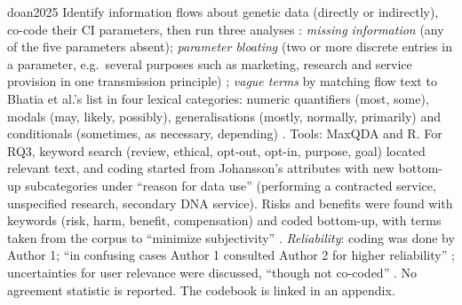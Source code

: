 \begin{papercard}{doan2025}
 Identify information flows about genetic data (directly or indirectly), co-code their CI parameters, then run three analyses : \emph{missing information} (any of the five parameters absent); \emph{parameter bloating} (two or more discrete entries in a parameter, e.g.\ several purposes such as marketing, research and service provision in one transmission principle) ; \emph{vague terms} by matching flow text to Bhatia et al.'s list in four lexical categories: numeric quantifiers (most, some), modals (may, likely, possibly), generalisations (mostly, normally, primarily) and conditionals (sometimes, as necessary, depending) . Tools: MaxQDA and R. For RQ3, keyword search (review, ethical, opt-out, opt-in, purpose, goal) located relevant text, and coding started from Johansson's attributes with new bottom-up subcategories under ``reason for data use'' (performing a contracted service, unspecified research, secondary DNA service). Risks and benefits were found with keywords (risk, harm, benefit, compensation) and coded bottom-up, with terms taken from the corpus to ``minimize subjectivity'' . \emph{Reliability}: coding was done by Author 1; ``in confusing cases Author 1 consulted Author 2 for higher reliability'' ; uncertainties for user relevance were discussed, ``though not co-coded'' . No agreement statistic is reported. The codebook is linked in an appendix.


\end{papercard}

